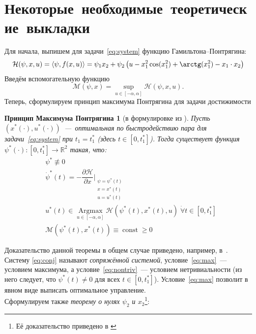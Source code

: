 \documentclass[11pt, oneside, final]{article}
\theoremstyle{break}
\newtheorem*{PMP}{Принцип Максимума Понтрягина}
\numberwithin{equation}{section}
\theoremstyle{plain}
\theoremstyle{definition}
\DeclareMathOperator{\Argmax}{Argmax}
\DeclareMathOperator{\const}{const}
\begin{document}
    \section{Некоторые~необходимые~теоретические~выкладки}
    \label{sec:theory}
    Для начала, выпишем для задачи~\eqref{eq:system} функцию Гамильтона--Понтрягина:
    \begin{equation*}       \mathcal{H}(\psi,x,u)=\left<\psi,f(x,u)\right>=\psi_1x_2+\psi_2\left(u - x_1^2 \cos(x_1^2) + \arctg(x_1^2) - x_1\cdot x_2\right)
    \end{equation*}
    Введём вспомогательную функцию
    \[
    \mathcal{M}(\psi,x)=\sup\limits_{u\in[-\alpha,\alpha]}\mathcal{H}(\psi,x,u).
    \]
    Теперь, сформулируем принцип максимума Понтрягина для задачи достижимости
    \begin{PMP}[в формулировке из \cite{Roublev:optimal}]
    	Пусть \( \left(x^*(\cdot),u^*(\cdot)\right) \)~---~оптимальная по быстродействию пара для задачи~\eqref{eq:system} при \( t_1=t_1^* \) (здесь \( t\in[0,t_1^*] \)). Тогда существует функция \( \psi^*(\cdot):[0,t_1^*]\rightarrow\mathbb{R}^2 \) такая, что:
    \begin{align}
            & \psi^* \not \equiv0 \label{eq:nontriv} \\
            & \dot{\psi}^*(t)=-\dfrac{\partial \mathcal{H}}{\partial x}\bigg|_{\substack{ \psi=\psi^*(t)\\ x=x^*(t) \\ u=u^*(t)}}  \label{eq:conj} \\
            & u^*(t) \in \Argmax\limits_{u\in[-\alpha,\alpha]} \mathcal{H}(\psi^*(t),x^*(t),u) \; \dot \forall t\in[0,t_1^*] \label{eq:max} \\
            & \mathcal{M}(\psi^*(t),x^*(t))\equiv\const\geqslant 0
        \end{align}
        
    \end{PMP}
    \noindent
    Доказательство данной теоремы в общем случае приведено, например, в~\cite{Pontr'yaginEtAl:maximum}. Систему \eqref{eq:conj} называют \emph{сопряжённой системой}, условие~\eqref{eq:max}~--- условием максимума, а условие~\eqref{eq:nontriv}~--- условием нетривиальности (из него следует, что \( \psi^*(t)\ne0 \) для всех \( t\in[0,t_1^*] \)). Условие~\eqref{eq:max} позволит в явном виде выписать оптимальное управление. \\ Сформулируем также \textit{теорему о нулях \( \psi_2 \) и \( x_2 \)}\footnote{Её доказательство  приведено в \cite{Roublev:optimal}}:
\end{document}
